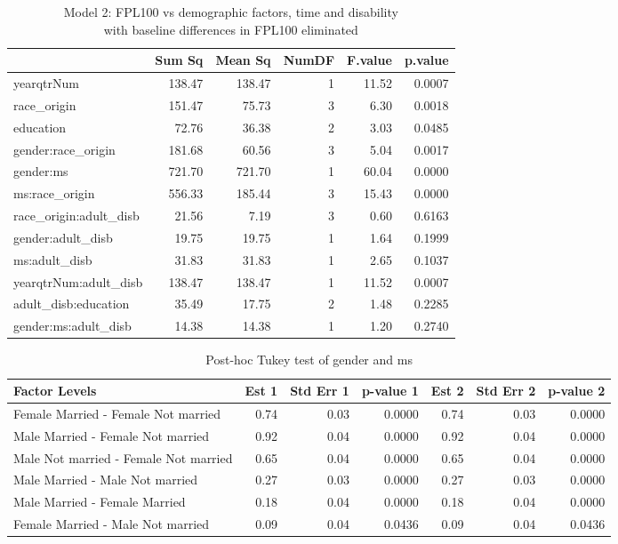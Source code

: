 \documentclass[11pt]{extarticle} %
\begin{document}
\noindent
\begin{table}[H]
\small
\centering
\begin{tabular}{lrrrrr}
  \hline
 & Sum Sq & Mean Sq & NumDF & F.value & p.value \\ 
  \hline
  yearqtrNum & 138.47 & 138.47 & 1 & 11.52 & 0.0007 \\ 
  race\_origin & 151.47 & 75.73 & 3 & 6.30 & 0.0018 \\ 
  education & 72.76 & 36.38 & 2 & 3.03 & 0.0485 \\ 
  gender:race\_origin & 181.68 & 60.56 & 3 & 5.04 & 0.0017 \\ 
  gender:ms & 721.70 & 721.70 & 1 & 60.04 & 0.0000 \\ 
  ms:race\_origin & 556.33 & 185.44 & 3 & 15.43 & 0.0000 \\ 
  race\_origin:adult\_disb & 21.56 & 7.19 & 3 & 0.60 & 0.6163 \\ 
  gender:adult\_disb & 19.75 & 19.75 & 1 & 1.64 & 0.1999 \\ 
  ms:adult\_disb & 31.83 & 31.83 & 1 & 2.65 & 0.1037 \\ 
  yearqtrNum:adult\_disb & 138.47 & 138.47 & 1 & 11.52 & 0.0007 \\ 
  adult\_disb:education & 35.49 & 17.75 & 2 & 1.48 & 0.2285 \\ 
  gender:ms:adult\_disb & 14.38 & 14.38 & 1 & 1.20 & 0.2740 \\ 
   \hline
\end{tabular}
\caption{Model 2: FPL100 vs demographic factors, time and disability \\ with baseline differences in FPL100 eliminated} 
\label{tab:Table2Anova2}
\end{table}

\begin{table}[H]
\small
\centering
\begin{tabular}{lrrrrrr}
  \hline
Factor Levels & Est 1 & Std Err 1 & p-value 1 & Est 2 & Std Err 2 & p-value 2 \\ 
  \hline
  Female Married -  Female Not married & 0.74 & 0.03 & 0.0000 & 0.74 & 0.03 & 0.0000 \\ 
    Male Married -  Female Not married & 0.92 & 0.04 & 0.0000 & 0.92 & 0.04 & 0.0000 \\ 
    Male Not married -  Female Not married & 0.65 & 0.04 & 0.0000 & 0.65 & 0.04 & 0.0000 \\ 
    Male Married -  Male Not married & 0.27 & 0.03 & 0.0000 & 0.27 & 0.03 & 0.0000 \\ 
    Male Married -  Female Married & 0.18 & 0.04 & 0.0000 & 0.18 & 0.04 & 0.0000 \\ 
    Female Married -  Male Not married & 0.09 & 0.04 & 0.0436 & 0.09 & 0.04 & 0.0436 \\ 
   \hline
\end{tabular}
\caption{Post-hoc Tukey test of gender and ms}
\label{tab:Table3GenderMS}
\end{table}

\newpage

\end{document}
